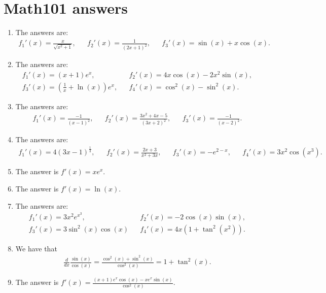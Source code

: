 \newpage
\section{Math101 answers}
\begin{enumerate}

	\item The answers are:
	\begin{align*}
	f_1'(x)=\frac{x}{\sqrt{x^2+1}},&& f_2'(x)=\frac{1}{(2x+1)^2},&& f_3'(x)=\sin(x)+x\cos(x).
	\end{align*}

	\item The answers are:
	\begin{align*}
	f_1'(x)=(x+1)e^x,&& f_2'(x)=4x\cos(x)-2x^2\sin(x),\\ f_3'(x)=(\frac{1}{x}+\ln(x))e^x,&& f_4'(x)=\cos^2(x)-\sin^2(x).
	\end{align*}

	\item The answers are:
	\begin{align*}
	f_1'(x)=\frac{-1}{(x-1)^2},&&f_2'(x)=\frac{3x^2+4x-5}{(3x+2)^2},&&f_3'(x)=\frac{-1}{(x-2)^2}.
	\end{align*}
	
	\item The answers are:
	\begin{align*}
	f_1'(x)=4(3x-1)^\frac{1}{3},&& f_2'(x)=\frac{2x+3}{x^2+3x},&& f_3'(x)=-e^{2-x},&&f_4'(x)=3x^2\cos(x^3).
	\end{align*}
	
	\item \label{it:diff24} The answer is $f'(x)=xe^x$.
	
	
	\item \label{it:diff23} The answer is $f'(x)=\ln(x)$.
	
	\item The answers are:
	\begin{align*}
	f_1'(x)=3x^2e^{x^3},&&f_2'(x)=-2\cos(x)\sin(x),\\f_3'(x)=3\sin^2(x)\cos(x)&&f_4'(x)=4x(1+\tan^2(x^2)).
	\end{align*}
		
	\item\label{it:diff21} We have that 
	\begin{align*}
	\frac{d}{dx} \frac{\sin(x)}{\cos(x)}=\frac{\cos^2(x)+\sin^2(x)}{\cos^2(x)}=1+\tan^2(x).
	\end{align*}

	\item The answer is $f'(x)=\frac{(x+1)e^x\cos(x)-xe^x\sin(x)}{\cos^2(x)}$.
		

\end{enumerate}
